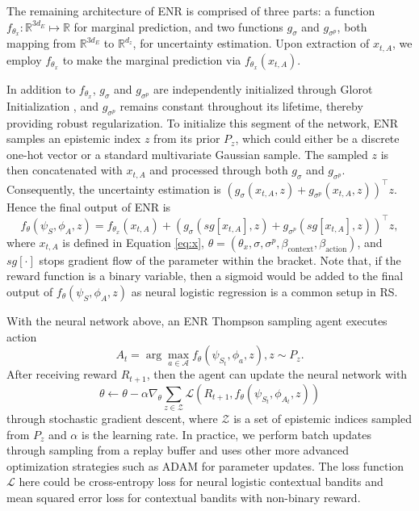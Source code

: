 The remaining architecture of ENR is comprised of three parts: a function $f_{\theta_x}: \mathbb{R}^{3d_E} \mapsto \mathbb{R}$ for marginal prediction, and two functions $g_{\sigma}$ and $g_{\sigma^p}$, both mapping from $\mathbb{R}^{3d_E}$ to $\mathbb{R}^{d_z}$, for uncertainty estimation. Upon extraction of $x_{t, A}$, we employ $f_{\theta_x}$ to make the marginal prediction via $f_{\theta_x}(x_{t,A})$.

In addition to $f_{\theta_x}$, $g_{\sigma}$ and $g_{\sigma^p}$ are independently initialized through Glorot Initialization \cite{glorot2010understanding, bartlett2017spectrally}, and $g_{\sigma^p}$ remains constant throughout its lifetime, thereby providing robust regularization. To initialize this segment of the network, ENR samples an epistemic index $z$ from its prior $P_z$, which could either be a discrete one-hot vector or a standard multivariate Gaussian sample. The sampled $z$ is then concatenated with $x_{t, A}$ and processed through both $g_{\sigma}$ and $g_{\sigma^p}$. Consequently, the uncertainty estimation is $(g_{\sigma}(x_{t, A}, z) + g_{\sigma^p}(x_{t, A}, z))^\top z$. Hence the final output of ENR is
\begin{equation} \label{eq:forward}
    f_\theta(\psi_S, \phi_A, z) = f_{\theta_x}(x_{t, A}) + (g_{\sigma}(sg[x_{t, A}], z) + g_{\sigma^p}(sg[x_{t, A}], z))^\top z,
\end{equation}
where $x_{t, A}$ is defined in Equation \ref{eq:x}, $\theta = (\theta_x, \sigma, \sigma^p, \beta_{\text{context}}, \beta_{\text{action}})$, and $sg[\cdot]$ stops gradient flow of the parameter within the bracket. Note that, if the reward function is a binary variable, then a sigmoid would be added to the final output of $f_\theta(\psi_S, \phi_A, z)$ as neural logistic regression is a common setup in RS. 

With the neural network above, an ENR Thompson sampling agent executes action 
\begin{equation}
    A_t = \arg\max_{a \in \mathcal{A}}f_\theta(\psi_{S_t}, \phi_a, z), z \sim P_z.
\end{equation}
After receiving reward $R_{t+1}$, then the agent can update the neural network with 
\begin{equation}
    \theta \leftarrow \theta - \alpha\nabla_{\theta}\sum_{z\in \mathcal{Z}}\mathcal{L}(R_{t+1}, f_\theta(\psi_{S_t}, \phi_{A_t}, z))
\end{equation}
through stochastic gradient descent, where $\mathcal{Z}$ is a set of epistemic indices sampled from $P_z$ and $\alpha$ is the learning rate. In practice, we perform batch updates through sampling from a replay buffer and uses other more advanced optimization strategies such as ADAM \cite{kingma2015adam} for parameter updates. The loss function $\mathcal{L}$ here could be cross-entropy loss for neural logistic contextual bandits and mean squared error loss for contextual bandits with non-binary reward. 

